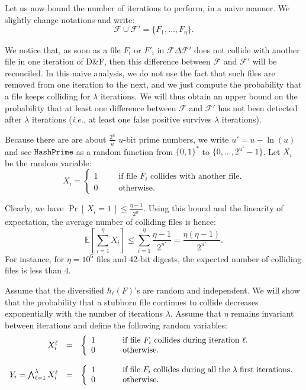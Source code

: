 \documentclass[twoside,envcountsame,runningheads]{llncs}
\newcommand{\Prob}[1]{{\Pr\left[\,{#1}\,\right]}}
\newcommand{\EE}[1]{{\mathbb{E}\left[{#1}\right]}}
\newcommand{\Files}{\mathcal{F}}
\newcommand{\df}{D\&F\xspace}
\newcommand{\ie}{\textit{i.e.}\xspace}
\newcommand{\HashPrime}{\ensuremath{\mathtt{HashPrime}}}
\begin{document}
Let us now bound the number of iterations to perform, in a naive manner.
We slightly change notations and write:
\[ \Files \cup \Files' = \{ F_1, \dots, F_\eta \}. \]

We notice that, as soon as a file $F_i$ or $F'_i$ in $\Files \Delta \Files'$ does not collide with another file in one iteration of \df, then this difference between $\Files$ and $\Files'$ will be reconciled.
In this naive analysis, we do not use the fact that such files are removed from one iteration to the next, and we just compute the probability that a file keeps colliding for $\lambda$ iterations. We will thus obtain an upper bound on the probability that at least one difference between $\Files$ and $\Files'$ has not been detected after $\lambda$ iterations (\ie, at least one false positive survives $\lambda$ iterations).

Because there are are about $\frac{2^u}{u}$ $u$-bit prime numbers, we write $u' = u - \ln(u)$ and see $\HashPrime$ as a random function from $\{0,1\}^*$ to $\{0,\dots,2^{u'}-1\}$. Let $X_i$ be the random variable:
\[
X_i =
\left\{
\begin{array}{lcl}
1 & ~~~~&  \mbox{if file $F_i$ collides with another file.}\\
0 & ~~~~&  \mbox{otherwise.}
\end{array}
\right.
\]

Clearly, we have $\Prob{X_i = 1} \le \frac{\eta -1}{2^{u'}}$.
Using this bound and the linearity of expectation, the average number of colliding files is hence:
\[ \EE{\sum_{i=1}^{\eta} X_i} \le \sum_{i=1}^{\eta} \frac{\eta -1}{2^{u'}} = \frac{\eta (\eta - 1)}{2^{u'}}. \]
For instance, for $\eta=10^6$ files and 42-bit digests, the expected number of colliding files is less than $4$.

Assume that the diversified $\hbar_\ell(F)$'s are random and independent. 
We will show that the probability that a stubborn file continues to collide decreases exponentially with the number of iterations $\lambda$. Assume that $\eta$ remains invariant between iterations and define the following random variables:
\[
\begin{array}{rcl}
X^{\ell}_i & = &
\left\{
\begin{array}{lcl}
1 & ~~~~&  \parbox[t]{.6\textwidth}{if file $F_i$ collides during iteration $\ell$.}\\
0 & ~~~~&  \mbox{otherwise.}
\end{array}
\right.\\
\\
Y_i = \bigwedge_{\ell=1}^\lambda X^{\ell}_i & = &
\left\{
\begin{array}{lcl}
1 & ~~~~&  \parbox[t]{.6\textwidth}{if file $F_i$ collides during all the $\lambda$ first iterations.}\\
0 & ~~~~&  \mbox{otherwise.}
\end{array}
\right.
\end{array}\]
\end{document}
